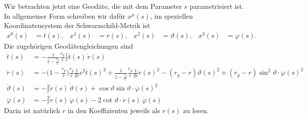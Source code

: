 Wir betrachten jetzt eine Geodäte, die mit dem Parameter $s$ parametrisiert ist.
In allgemeiner Form schreiben wir dafür $x^\mu(s)$, im speziellen
Koordinatensystem der Schwarzschild-Metrik ist
\[
\begin{aligned}
x^0(s)&=t(s),
&
x^1(s)&=r(s),
&
x^2(s)&=\vartheta(s),
&
x^3(s)&=\varphi(s).
\end{aligned}
\]
Die zugehörigen Geodätengleichungen sind
\begin{align*}
\ddot t(s)
&=
-\frac{1}{1-\displaystyle\frac{r_g}{r}}\frac{r_g}{r}\frac{1}{r}\dot t(s)\,\dot r(s)
\\
\ddot r(s)
&=
-\biggl(1-\frac{r_g}{r}\biggr)\frac{r_g}{r}\frac1{2r}c^2\dot t(s)^2
+\frac{1}{1-\displaystyle\frac{r_g}{r}} \frac{r_g}{r}\frac1{2r}\dot r(s)^2
-(r_g-r)\dot \vartheta(s)^2 + (r_g-r)\sin^2 \vartheta \cdot \dot \varphi(s)^2
\\
\ddot \vartheta(s)
&=
-\frac{2}{r} \dot r(s)\, \dot \vartheta(s)
+\cos\vartheta\sin\vartheta \cdot \dot\varphi(s)^2
\\
\ddot \varphi(s)
&=
-\frac{2}{r} \dot r(s)\,\dot \varphi(s)
-2\cot\vartheta \cdot \dot r(s)\,\dot\varphi(s)
\end{align*}
Darin ist natürlich $r$ in den Koeffizienten jeweils als $r(s)$ zu lesen.

